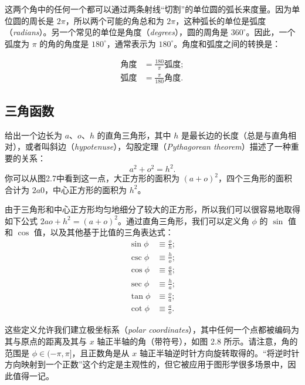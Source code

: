 \documentclass[lang=cn,12pt,marginpar=margintrue]{elegantbook}
\begin{document}
这两个角中的任何一个都可以通过两条射线“切割”的单位圆的弧长来度量。因为单位圆的周长是 $2\pi$，所以两个可能的角总和为 $2\pi$，这种弧长的单位是弧度（\textit{radians}）。另一个常见的单位是角度（\textit{degrees}），圆的周角是 $360^\circ$。因此，一个弧度为 $\pi$ 的角的角度是 $180^\circ$，通常表示为 $180^\circ$。角度和弧度之间的转换是：

\[
  \begin{aligned}
    \text{角度} & =\frac{180}{\pi} \text{弧度}; \\
    \text{弧度} & =\frac{\pi}{180} \text{角度}.
  \end{aligned}
\]

\subsection{三角函数}


给出一个边长为 $a$、$o$、$h$ 的直角三角形，其中 $h$ 是最长边的长度（总是与直角相对），或者叫斜边（\textit{hypotenuse}），勾股定理（\textit{Pythagorean theorem}）描述了一种重要的关系：
\[
  a^2+o^2=h^2.
\]
你可以从图2.7中看到这一点，大正方形的面积为 $(a+o)^2$，四个三角形的面积合计为 $2a0$，中心正方形的面积为 $h^2$。

由于三角形和中心正方形均匀地细分了较大的正方形，所以我们可以很容易地取得如下公式 $2ao+h^2=(a+o)^2$。通过直角三角形，我们可以定义角 $\phi$ 的 $\sin$ 值和 $\cos$ 值，以及其他基于比值的三角表达式：
\[
  \begin{aligned}
    \sin \phi & \equiv \frac{o}{h}; \\
    \csc \phi & \equiv \frac{h}{o}; \\
    \cos \phi & \equiv \frac{a}{h}; \\
    \sec \phi & \equiv \frac{h}{a}; \\
    \tan \phi & \equiv \frac{o}{a}; \\
    \cot \phi & \equiv \frac{a}{o}.
  \end{aligned}
\]

这些定义允许我们建立极坐标系（\textit{polar coordinates}），其中任何一个点都被编码为其与原点的距离及其与 $x$ 轴正半轴的角（带符号），如图 2.8 所示。请注意，角的范围是 $\phi\in(-\pi,\pi]$，且正数角是从 $x$ 轴正半轴逆时针方向旋转取得的。“将逆时针方向映射到一个正数”这个约定是主观性的，但它被应用于图形学很多场景中，因此值得一记。
\end{document}
